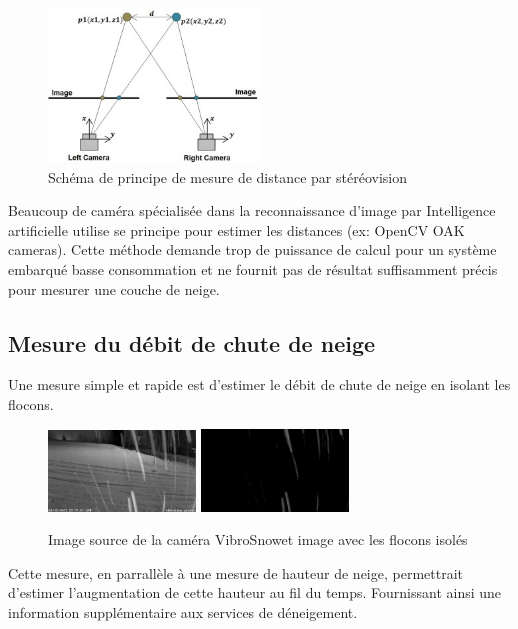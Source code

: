 \begin{figure}[H]
    \centering
    \includegraphics[width=0.5\textwidth]{Images/computer_vision/stereovision.jpg}
    \caption[]{Schéma de principe de mesure de distance par stéréovision}
    \label{Stereovision}
\end{figure}
\noindent
Beaucoup de caméra spécialisée dans la reconnaissance d'image par Intelligence artificielle utilise se principe
pour estimer les distances (ex: OpenCV OAK cameras).
Cette méthode demande trop de puissance de calcul pour un système embarqué basse consommation et ne fournit
pas de résultat suffisamment précis pour mesurer une couche de neige.
\newpage

\subsection{Mesure du débit de chute de neige}
Une mesure simple et rapide est d'estimer le débit de chute de neige en isolant les flocons.
\begin{figure}[H]
    \centering
    \includegraphics[width=0.35\textwidth]{Images/computer_vision/snow_cam.png}
    \includegraphics[width=0.35\textwidth]{Images/computer_vision/snowfall.png}
    \caption[]{Image source de la caméra VibroSnow\footnotemark[1] et image avec les flocons isolés}
    \label{Snowfall}
\end{figure}
\noindent
Cette mesure, en parrallèle à une mesure de hauteur de neige, permettrait d'estimer 
l'augmentation de cette hauteur au fil du temps. Fournissant ainsi une information supplémentaire
aux services de déneigement.

